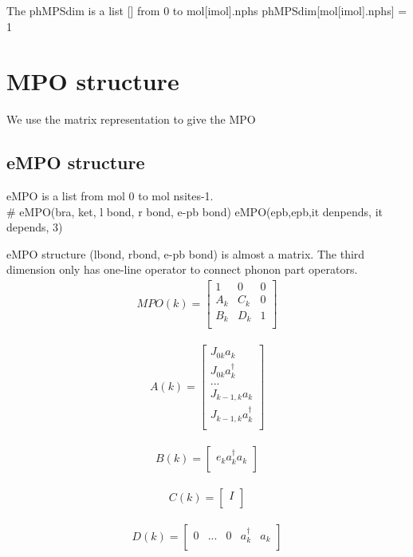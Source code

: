 \documentclass[a4paper,11pt]{ctexart}
\begin{document}
The phMPSdim is a list [] from 0 to mol[imol].nphs
phMPSdim[mol[imol].nphs] = 1
    

\section{MPO structure}
We use the matrix representation to give the MPO
\subsection{eMPO structure}
eMPO is a list from mol 0 to mol nsites-1. \\
\# eMPO(bra, ket, l bond, r bond, e-pb bond)
eMPO(epb,epb,it denpends, it depends, 3)

eMPO structure (lbond, rbond, e-pb bond) is almost a matrix.
The third dimension only has one-line operator to connect phonon part operators.
\begin{gather}
MPO(k) = 
\begin{bmatrix}
    1 & 0 & 0  \\
    A_k & C_k & 0  \\
    B_k & D_k & 1  \\
\end{bmatrix}
\end{gather}

\begin{gather}
A(k) = 
\begin{bmatrix}
    J_{0k} a_k  \\
    J_{0k} a^\dagger_k \\
    ...  \\
    J_{k-1,k} a_k  \\
    J_{k-1,k} a^\dagger_k \\
\end{bmatrix}
\end{gather}

\begin{gather}
B(k) = 
\begin{bmatrix}
    e_k a^\dagger_k a_k \\
\end{bmatrix}
\end{gather}

\begin{gather}
C(k) = 
\begin{bmatrix}
    I  \\ 
\end{bmatrix}
\end{gather}

\begin{gather}
D(k) = 
\begin{bmatrix}
    0 & ... & 0 & a^\dagger_k & a_k  \\ 
\end{bmatrix}
\end{gather}
\end{document}
